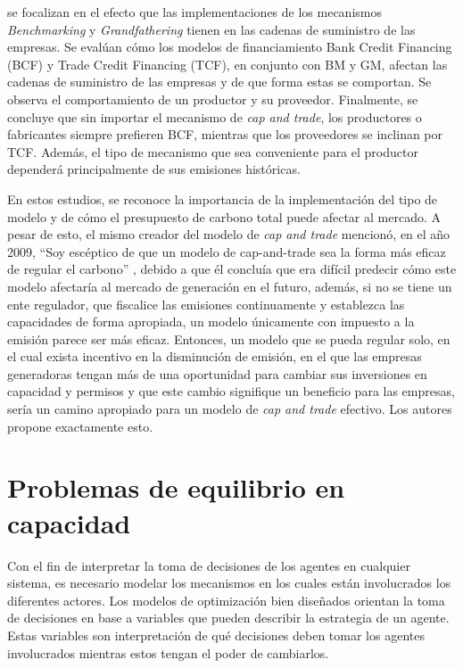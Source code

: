  se focalizan en el efecto que las implementaciones de los mecanismos \textit{Benchmarking} y \textit{Grandfathering} tienen en las cadenas de suministro de las empresas. Se evalúan cómo los modelos de financiamiento Bank Credit Financing (BCF) y Trade Credit Financing (TCF), en conjunto con BM y GM, afectan las cadenas de suministro de las empresas y de que forma estas se comportan. Se observa el comportamiento de un productor y su proveedor. Finalmente, se concluye que sin importar el mecanismo de \textit{cap and trade}, los productores o fabricantes siempre prefieren BCF, mientras que los proveedores se inclinan por TCF. Además, el tipo de mecanismo que sea conveniente para el productor dependerá principalmente de sus emisiones históricas.
\vspace{2.5mm}

En estos estudios, se reconoce la importancia de la implementación del tipo de modelo y de cómo el presupuesto de carbono total puede afectar al mercado. A pesar de esto, el mismo creador del modelo de \textit{cap and trade} mencionó, en el año 2009, ``Soy escéptico de que un modelo de cap-and-trade sea la forma más eficaz de regular el carbono'' , debido a que él concluía que era difícil predecir cómo este modelo afectaría al mercado de generación en el futuro, además, si no se tiene un ente regulador, que fiscalice las emisiones continuamente y establezca las capacidades de forma apropiada, un modelo únicamente con impuesto a la emisión parece ser más eficaz. Entonces, un modelo que se pueda regular solo, en el cual exista incentivo en la disminución de emisión, en el que las empresas generadoras tengan más de una oportunidad para cambiar sus inversiones en capacidad y permisos y que este cambio signifique un beneficio para las empresas, sería un camino apropiado para un modelo de \textit{cap and trade} efectivo. Los autores  propone exactamente esto.


\section{Problemas de equilibrio en capacidad} \label{c21}

Con el fin de interpretar la toma de decisiones de los agentes en cualquier sistema, es necesario modelar los mecanismos en los cuales están involucrados los diferentes actores. Los modelos de optimización bien diseñados orientan la toma de decisiones en base a variables que pueden describir la estrategia de un agente. Estas variables son interpretación de qué decisiones deben tomar los agentes involucrados mientras estos tengan el poder de cambiarlos. 
\vspace{2.5mm}

